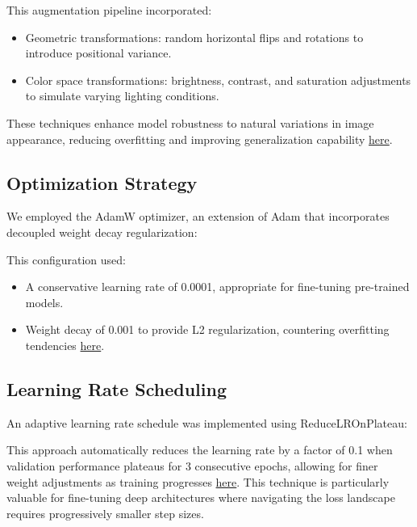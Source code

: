 \documentclass[a4paper,12pt]{article}
\begin{document}
This augmentation pipeline incorporated:
\begin{itemize}
    \item Geometric transformations: random horizontal flips and rotations to introduce positional variance.
    \item Color space transformations: brightness, contrast, and saturation adjustments to simulate varying lighting conditions.
\end{itemize}

These techniques enhance model robustness to natural variations in image appearance, reducing overfitting and improving generalization capability \href{https://arxiv.org/abs/1712.04621}{here}.


\subsection{Optimization Strategy}
We employed the AdamW optimizer, an extension of Adam that incorporates decoupled weight decay regularization:


This configuration used:
\begin{itemize}
    \item A conservative learning rate of 0.0001, appropriate for fine-tuning pre-trained models.
    \item Weight decay of 0.001 to provide L2 regularization, countering overfitting tendencies \href{https://openreview.net/forum?id=Bkg6RiCqY7}{here}.
\end{itemize}

\subsection{Learning Rate Scheduling}
An adaptive learning rate schedule was implemented using ReduceLROnPlateau:


This approach automatically reduces the learning rate by a factor of 0.1 when validation performance plateaus for 3 consecutive epochs, allowing for finer weight adjustments as training progresses \href{https://ieeexplore.ieee.org/document/7926641}{here}. This technique is particularly valuable for fine-tuning deep architectures where navigating the loss landscape requires progressively smaller step sizes.
\end{document}
